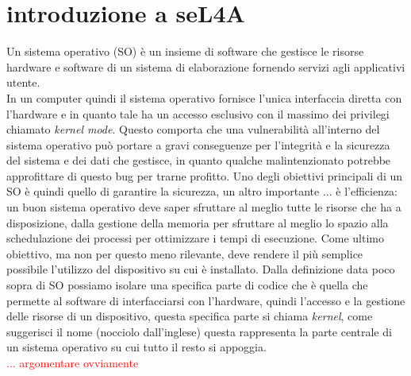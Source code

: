 \chapter{introduzione a seL4A}
Un sistema operativo (SO) è un insieme di software che gestisce le risorse hardware e software di un sistema di elaborazione fornendo servizi agli applicativi utente.\\
In un computer quindi il sistema operativo fornisce l'unica interfaccia diretta con l'hardware e in quanto tale ha un accesso esclusivo con il massimo dei privilegi chiamato \textit{kernel mode}. Questo comporta che una vulnerabilità all'interno del sistema operativo può portare a gravi conseguenze per l'integrità e la sicurezza del sistema e dei dati che gestisce, in quanto qualche malintenzionato potrebbe approfittare di questo bug per trarne profitto.
Uno degli obiettivi principali di un SO è quindi quello di garantire la sicurezza, un altro importante ... è l'efficienza: un buon sistema operativo deve saper sfruttare al meglio tutte le risorse che ha a disposizione, dalla gestione della memoria per sfruttare al meglio lo spazio alla schedulazione dei processi per ottimizzare i tempi di esecuzione. Come ultimo obiettivo, ma non per questo meno rilevante, deve rendere il più semplice possibile l'utilizzo del dispositivo su cui è installato.
Dalla definizione data poco sopra di SO possiamo isolare una specifica parte di codice che è quella che permette al software di interfacciarsi con l'hardware, quindi l'accesso e la gestione delle risorse di un dispositivo, questa specifica parte si chiama \textit{kernel}, come suggerisci il nome (nocciolo dall'inglese) questa rappresenta la parte centrale di un sistema operativo su cui tutto il resto si appoggia.\\
\textcolor{red}{... argomentare ovviamente}

